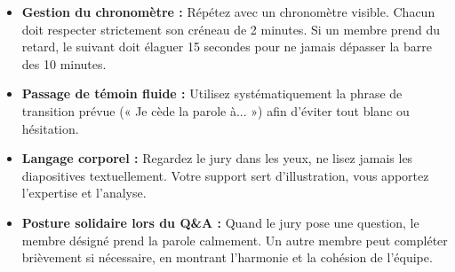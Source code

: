 \documentclass[a4paper,11pt]{article}
\begin{document}
\begin{itemize}[leftmargin=0.8cm, itemsep=3pt]
	\item \textbf{Gestion du chronomètre :} Répétez avec un chronomètre visible. Chacun doit respecter strictement son créneau de 2 minutes. Si un membre prend du retard, le suivant doit élaguer 15 secondes pour ne jamais dépasser la barre des 10 minutes.
	\item \textbf{Passage de témoin fluide :} Utilisez systématiquement la phrase de transition prévue (« Je cède la parole à... ») afin d'éviter tout blanc ou hésitation.
	\item \textbf{Langage corporel :} Regardez le jury dans les yeux, ne lisez jamais les diapositives textuellement. Votre support sert d'illustration, vous apportez l'expertise et l'analyse.
	\item \textbf{Posture solidaire lors du Q\&A :} Quand le jury pose une question, le membre désigné prend la parole calmement. Un autre membre peut compléter brièvement si nécessaire, en montrant l'harmonie et la cohésion de l'équipe.
\end{itemize}
\end{document}
